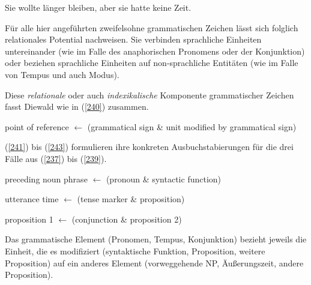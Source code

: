 \begin{exe}
	\ex\label{239} 
	Sie wollte länger bleiben, aber sie hatte keine Zeit.
\end{exe}
Für alle hier angeführten zweifelsohne grammatischen Zeichen lässt sich folglich relationales Potential nachweisen. Sie verbinden sprachliche Einheiten unter\-einander (wie im Falle des anaphorischen Pronomens oder der Konjunktion) oder beziehen sprachliche Einheiten auf non-sprachliche Entitäten (wie im Falle von Tempus und auch Modus).

Diese \textit{relationale} oder auch \textit{indexikalische} Komponente grammatischer Zeichen fasst Diewald wie in (\ref{240}) zusammen.

\begin{exe}
	\ex\label{240} 
	point of reference $\leftarrow$ (grammatical sign \& unit modified by grammatical sign)
	\hfill\hbox{\citet[415]{Diewald2006}}
\end{exe}
(\ref{241}) bis (\ref{243}) formulieren ihre konkreten Ausbuchstabierungen für die drei Fälle aus (\ref{237}) bis (\ref{239}). 
	
\begin{exe}
	\ex\label{241} 
	preceding noun phrase $\leftarrow$ (pronoun \& syntactic function)
\end{exe}	
\vspace{-0.65cm}
\begin{exe}
	\ex\label{242} 
	utterance time $\leftarrow$ (tense marker \& proposition)
\end{exe}		
\vspace{-0.65cm}		
\begin{exe}
	\ex\label{243} 
	proposition 1 $\leftarrow$ (conjunction \& proposition 2)
	\hfill\hbox {\citet[415]{Diewald2006}}
\end{exe}															
Das grammatische Element (Pronomen, Tempus, Konjunktion) bezieht jeweils die Einheit, die es modifiziert (syntaktische Funktion, Proposition, weitere Proposition) auf ein anderes Element (vorweggehende NP, Äußerungszeit, andere Pro\-position).

